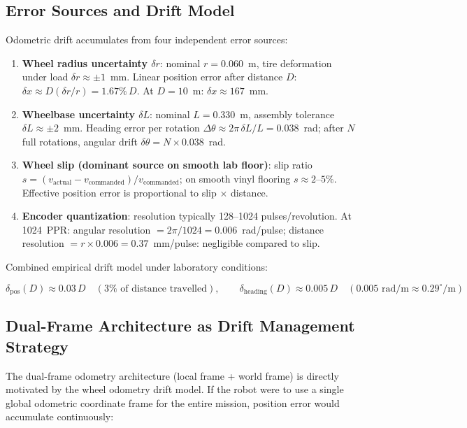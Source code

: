 \subsection{Error Sources and Drift Model}

Odometric drift accumulates from four independent error sources:

\begin{enumerate}[leftmargin=1.6em]
  \item \textbf{Wheel radius uncertainty $\delta r$}: nominal $r=0.060$~m, tire deformation under load $\delta r\approx\pm1$~mm. Linear position error after distance $D$: $\delta x \approx D(\delta r/r) = 1.67\%\,D$. At $D=10$~m: $\delta x\approx167$~mm.
  \item \textbf{Wheelbase uncertainty $\delta L$}: nominal $L=0.330$~m, assembly tolerance $\delta L\approx\pm2$~mm. Heading error per rotation $\Delta\theta \approx 2\pi\,\delta L/L = 0.038$~rad; after $N$ full rotations, angular drift $\delta\theta = N\times0.038$~rad.
  \item \textbf{Wheel slip (dominant source on smooth lab floor)}: slip ratio $s=(v_{\text{actual}}-v_{\text{commanded}})/v_{\text{commanded}}$; on smooth vinyl flooring $s\approx2$--$5\%$. Effective position error is proportional to slip $\times$ distance.
  \item \textbf{Encoder quantization}: resolution typically 128--1024 pulses/revolution. At 1024~PPR: angular resolution $=2\pi/1024=0.006$~rad/pulse; distance resolution $=r\times0.006=0.37$~mm/pulse: negligible compared to slip.
\end{enumerate}

Combined empirical drift model under laboratory conditions:

\begin{eqblock}
\begin{equation}
\delta_{\text{pos}}(D) \approx 0.03\,D \quad (3\% \text{ of distance travelled}), \qquad
\delta_{\text{heading}}(D) \approx 0.005\,D \quad (0.005 \text{ rad/m} \approx 0.29^\circ/\text{m})
\end{equation}
\end{eqblock}

\subsection{Dual-Frame Architecture as Drift Management Strategy}

The dual-frame odometry architecture (local frame + world frame) is directly motivated by the wheel odometry drift model. If the robot were to use a single global odometric coordinate frame for the entire mission, position error would accumulate continuously:

